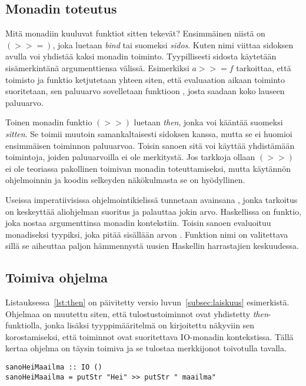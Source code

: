 \documentclass[finnish]{tktltiki2}
\begin{document}
\subsection{Monadin toteutus}

Mitä monadiin kuuluvat funktiot sitten tekevät? Ensimmäinen niistä on $(>>=)$, joka luetaan
\emph{bind} tai suomeksi \emph{sidos}. Kuten nimi viittaa sidoksen avulla voi yhdistää kaksi monadin
toiminto. Tyypillisesti sidosta käytetään sisämerkintänä argumenttiensa välissä. Esimerkiksi $a >>=
f$ tarkoittaa, että toimisto  ja funktio  ketjutetaan yhteen siten, että evaluaation
aikaan toiminto  suoritetaan, sen paluuarvo sovelletaan funktioon , josta saadaan
koko lauseen paluuarvo.

Toinen monadin funktio $(>>)$ luetaan \emph{then}, jonka voi kääntää suomeksi \emph{sitten}. Se
toimii muutoin samankaltaisesti sidoksen kanssa, mutta se ei huomioi ensimmäisen toiminnon
paluuarvoa. Toisin sanoen sitä voi käyttää yhdistämään toimintoja, joiden paluuarvoilla ei ole
merkitystä. Jos tarkkoja ollaan $(>>)$ ei ole teoriassa pakollinen toimivan monadin toteuttamiseksi,
mutta käytännön ohjelmoinnin ja koodin selkeyden näkökulmasta se on hyödyllinen.

Useissa imperatiivisissa ohjelmointikielissä tunnetaan avainsana , jonka tarkoitus on
keskeyttää aliohjelman suoritus ja palauttaa jokin arvo. Haskellissa  on funktio, joka
nostaa argumenttinsa monadin kontekstiin. Toisin sanoen  evaluoituu monadiseksi
tyypiksi, joka pitää sisällään arvon . Funktion  nimi on valitettava sillä se
aiheuttaa paljon hämmennystä uusien Haskellin harrastajien keskuudessa.

\subsection{Toimiva ohjelma}

Listauksessa~\ref{lst:then} on päivitetty versio luvun~\ref{subsec:laiskuus} esimerkistä. Ohjelmaa
on muutettu siten, että tulostustoiminnot ovat yhdistetty \emph{then}-funktiolla, jonka lisäksi
tyyppimääritelmä on kirjoitettu näkyviin sen korostamiseksi, että toiminnot ovat suoritettava
IO-monadin kontekstissa. Tällä kertaa ohjelma on täysin toimiva ja se tulostaa merkkijonot
toivotulla tavalla.

\begin{lstlisting}[float,label={lst:then},caption={Toimiva tulostus}]
sanoHeiMaailma :: IO ()
sanoHeiMaailma = putStr "Hei" >> putStr " maailma"
\end{lstlisting}
\end{document}
